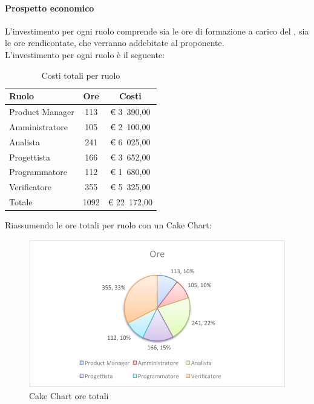 			\paragraph{Prospetto economico}
				L'investimento per ogni ruolo comprende sia le ore di formazione a carico del \groupname{}, sia le ore rendicontate, che verranno addebitate al proponente.\\
				L'investimento per ogni ruolo è il seguente:
				\begin{table}[H]
					\begin{center}
						\begin{tabular}{| l | c | c |}
							\hline
							Ruolo 			& Ore 	& Costi  \\ \hline
							
							Product Manager	& 113 	& \euro{} 3~390,00 	\\
							Amministratore 		& 105 	& \euro{} 2~100,00 	\\
							Analista	 		& 241 	& \euro{} 6~025,00 	\\
							Progettista 		& 166	& \euro{} 3~652,00 	\\
							Programmatore		& 112	& \euro{} 1~680,00	\\
							Verificatore		& 355 	& \euro{} 5~325,00 	\\ \hline \hline
							
							Totale	 		& 1092 	& \euro{} 22~172,00 	\\ \hline
						\end{tabular}
					\end{center}
					\caption{Costi totali per ruolo}
				\end{table}
				Riassumendo le ore totali per ruolo con un Cake Chart:
				\begin{figure}[H]\centering
					\includegraphics[width=\textwidth]{PianoDiProgetto/Pics/ChartTotOre.pdf}
					\caption{Cake Chart ore totali}
				\end{figure}
